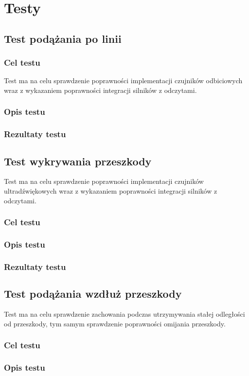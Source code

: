 \chapter{Testy}
\section{Test podążania po linii}
\subsection{Cel testu}
Test ma na celu sprawdzenie poprawności implementacji czujników odbiciowych wraz z wykazaniem poprawności integracji silników z odczytami.
\subsection{Opis testu}
\subsection{Rezultaty testu}

\section{Test wykrywania przeszkody}
Test ma na celu sprawdzenie poprawności implementacji czujników ultradźwiękowych wraz z wykazaniem poprawności integracji silników z odczytami.
\subsection{Cel testu}
\subsection{Opis testu}
\subsection{Rezultaty testu}

\section{Test podążania wzdłuż przeszkody}
Test ma na celu sprawdzenie zachowania podczas utrzymywania stałej odległości od przeszkody, tym samym sprawdzenie poprawności omijania przeszkody.
\subsection{Cel testu}
\subsection{Opis testu}
